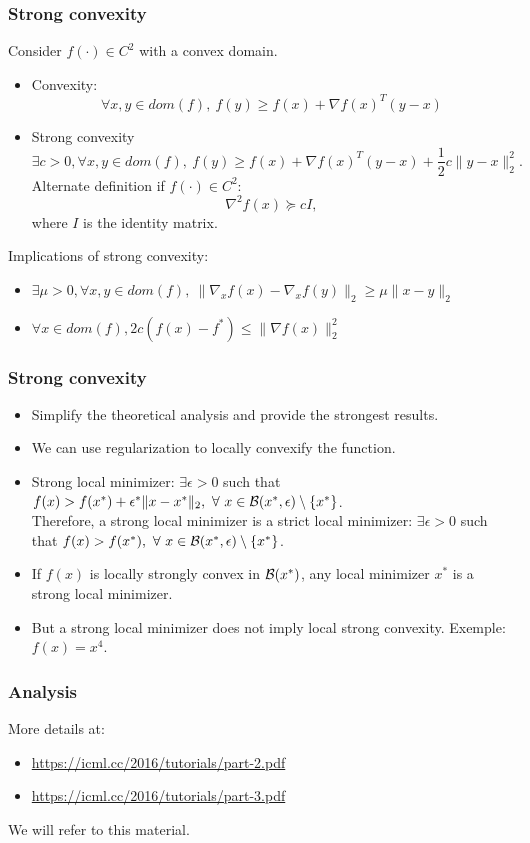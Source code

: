 \documentclass[usepdftitle=false, aspectratio=169]{beamer}
\begin{document}
\begin{frame}
\frametitle{Strong convexity}

Consider $f(\cdot) \in C^2$ with a convex domain.
\begin{itemize}
	\item Convexity:
	$$
	\forall x, y \in dom(f),\ f(y) \geq f(x) + \nabla f(x)^T(y-x)
	$$
	\item Strong convexity
	$$
	\exists c > 0, \forall x, y \in dom(f),\ f(y) \geq f(x) + \nabla f(x)^T(y-x) + \frac{1}{2} c \| y - x \|^2_2.
	$$
	Alternate definition if $f(\cdot) \in C^2$:
	$$
	\nabla^2 f(x) \succeq cI,
	$$
	where $I$ is the identity matrix.
\end{itemize}

Implications of strong convexity:
\begin{itemize}
	\item
	$\exists \mu > 0, \forall x, y \in dom(f),\ \| \nabla_x f(x) - \nabla_x f(y) \|_2 \geq \mu \| x - y \|_2$
	\item
	$\forall x \in dom(f), 2c (f(x) - f^*) \leq \| \nabla f(x) \|_2^2$
\end{itemize}

\end{frame}

\begin{frame}
\frametitle{Strong convexity}

\begin{itemize}
	\item Simplify the theoretical analysis and provide the strongest results.
	\item We can use regularization to locally convexify the function.
	\item Strong local minimizer:
        $\exists \epsilon > 0$ such that $f(x) > f(x^*) + \epsilon^*\| x-x^* \|_2,\ \forall\ x \in {\mathcal{B}}(x^*,\epsilon)\setminus\{x^*\}$.\\
       Therefore, a strong local minimizer is a strict local minimizer: $\exists \epsilon > 0$ such that $f(x) > f(x^*),\ \forall\ x \in {\mathcal{B}}(x^*,\epsilon)\setminus\{x^*\}$.
	\item If $f(x)$ is locally strongly convex in ${\mathcal{B}}(x^*)$, any local minimizer $x^*$ is a strong local minimizer.
	\item But a strong local minimizer does not imply local strong convexity. Exemple: $f(x) = x^4$.
\end{itemize}

\end{frame}

\begin{frame}
\frametitle{Analysis}

More details at:
\begin{itemize}
\item 
\url{https://icml.cc/2016/tutorials/part-2.pdf}
\item 
\url{https://icml.cc/2016/tutorials/part-3.pdf}
\end{itemize}

We will refer to this material.

\end{frame}
\end{document}
